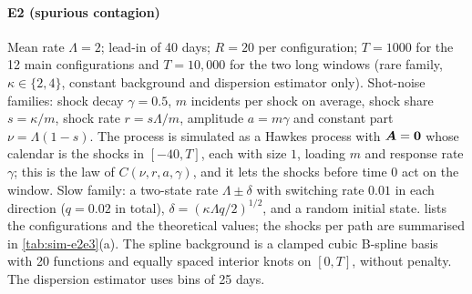 \paragraph{E2 (spurious contagion)} Mean rate $\Lambda=2$; lead-in of 40 days; $R=20$ per
configuration; $T=1000$ for the 12 main configurations and $T=10{,}000$ for the two long
windows (rare family, $\kappa\in\{2,4\}$, constant background and dispersion estimator
only). Shot-noise families: shock decay $\gamma=0.5$, $m$ incidents per shock on average,
shock share $s=\kappa/m$, shock rate $r=s\Lambda/m$, amplitude $a=m\gamma$ and constant part
$\nu=\Lambda(1-s)$. The process is simulated as a Hawkes process with $\bm{A}=\mathbf{0}$ whose
calendar is the shocks in $[-40,T]$, each with size $1$, loading $m$ and response rate
$\gamma$; this is the law of $C(\nu,r,a,\gamma)$, and it lets the shocks before time $0$
act on the window. Slow family: a two-state rate $\Lambda\pm\delta$ with switching rate
$0.01$ in each direction ($q=0.02$ in total), $\delta=(\kappa\Lambda q/2)^{1/2}$, and a
random initial state.  lists the configurations and the theoretical
values; the shocks per path are summarised in \cref{tab:sim-e2e3}(a). The spline
background is a clamped cubic B-spline basis with 20 functions and equally spaced interior
knots on $[0,T]$, without penalty. The dispersion estimator uses bins of 25 days.

